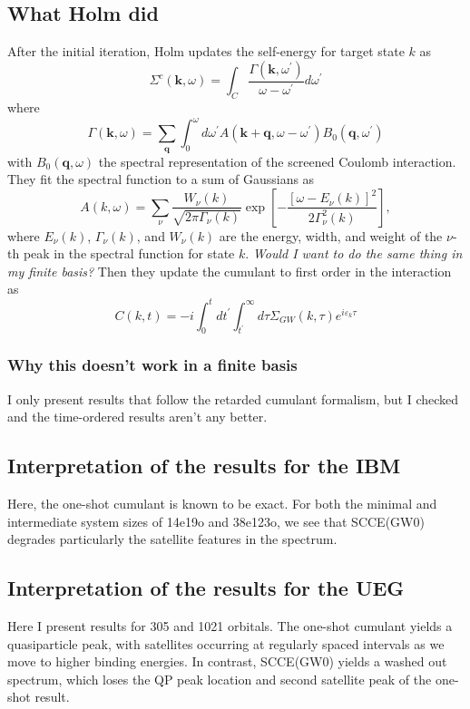 \subsection{What Holm did}
After the initial iteration, Holm updates the self-energy for target state $k$ as
\begin{equation}
\Sigma^{c}(\mathbf{k}, \omega)=\int_C \frac{\Gamma\left(\mathbf{k}, \omega^{\prime}\right)}{\omega-\omega^{\prime}} d \omega^{\prime}
\end{equation}
where
\begin{equation}
\Gamma(\mathbf{k}, \omega)=\sum_{\mathbf{q}} \int_0^\omega d \omega^{\prime} A\left(\mathbf{k}+\mathbf{q}, \omega-\omega^{\prime}\right) B_0\left(\mathbf{q}, \omega^{\prime}\right)
\end{equation}
with $B_0(\mathbf{q}, \omega)$ the spectral representation of the screened Coulomb interaction. They fit the spectral function to a sum of Gaussians as
\begin{equation}
    A(k, \omega)=\sum_\nu \frac{W_\nu(k)}{\sqrt{2 \pi \Gamma_\nu(k)}} \exp \left[-\frac{\left[\omega-E_\nu(k)\right]^2}{2 \Gamma_\nu^2(k)}\right],
\end{equation}
 where $E_\nu(k)$, $\Gamma_\nu(k)$, and $W_\nu(k)$ are the energy, width, and weight of the $\nu$-th peak in the spectral function for state $k$. \emph{Would I want to do the same thing in my finite basis?} Then they update the cumulant to first order in the interaction as 
\begin{equation}
C(k, t)=-i \int_0^t d t^{\prime} \int_{t^{\prime}}^{\infty} d \tau \Sigma_{G W}(k, \tau) e^{i \varepsilon_k \tau}
\end{equation}
\subsubsection{Why this doesn't work in a finite basis }
 I only present results that follow the retarded cumulant formalism, but I checked and the time-ordered results aren't any better.
\subsection{Interpretation of the results for the IBM}
Here, the one-shot cumulant is known to be exact. For both the minimal and intermediate system sizes of 14e19o and 38e123o, we see that SCCE(GW0) degrades particularly the satellite features in the spectrum.
\subsection{Interpretation of the results for the UEG}
Here I present results for 305 and 1021 orbitals. The one-shot cumulant yields a quasiparticle peak, with satellites occurring at regularly spaced intervals as we move to higher binding energies. In contrast, SCCE(GW0) yields a washed out spectrum, which loses the QP peak location and second satellite peak of the one-shot result.
